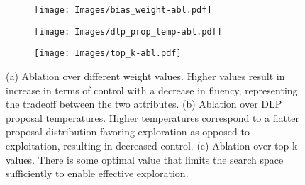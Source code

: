 \begin{figure}[H]
    \centering
    \begin{subfigure}[t]{0.3\textwidth}
        \texttt{[image: Images/bias\_weight-abl.pdf]}
        \caption{}
    \end{subfigure}
    \begin{subfigure}[t]{0.3\textwidth}
        \texttt{[image: Images/dlp\_prop\_temp-abl.pdf]}
        \caption{}
    \end{subfigure}
    \begin{subfigure}[t]{0.3\textwidth}
        \texttt{[image: Images/top\_k-abl.pdf]}
        \caption{}
    \end{subfigure}
    \caption{(a) Ablation over different weight values. Higher values result in increase in terms of control with a decrease in fluency, representing the tradeoff between the two attributes. (b) Ablation over DLP proposal temperatures. Higher temperatures correspond to a flatter proposal distribution favoring exploration as opposed to exploitation, resulting in decreased control. (c) Ablation over top-k values. There is some optimal value that limits the search space sufficiently to enable effective exploration.}
    \label{fig:abl-res}
\end{figure}
